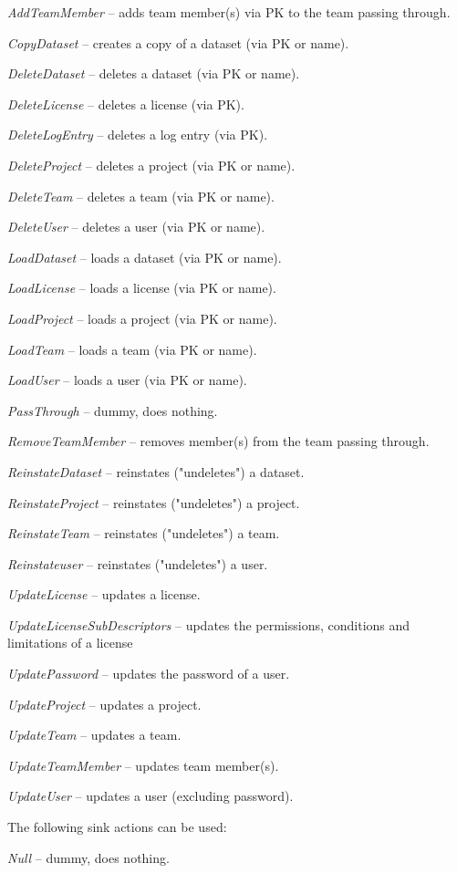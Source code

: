 \documentclass[a4paper]{book}
\begin{document}
\begin{tight_itemize}
  \item \textit{AddTeamMember} -- adds team member(s) via PK to the team passing through.
  \item \textit{CopyDataset} -- creates a copy of a dataset (via PK or name).
  \item \textit{DeleteDataset} -- deletes a dataset (via PK or name).
  \item \textit{DeleteLicense} -- deletes a license (via PK).
  \item \textit{DeleteLogEntry} -- deletes a log entry (via PK).
  \item \textit{DeleteProject} -- deletes a project (via PK or name).
  \item \textit{DeleteTeam} -- deletes a team (via PK or name).
  \item \textit{DeleteUser} -- deletes a user (via PK or name).
  \item \textit{LoadDataset} -- loads a dataset (via PK or name).
  \item \textit{LoadLicense} -- loads a license (via PK or name).
  \item \textit{LoadProject} -- loads a project (via PK or name).
  \item \textit{LoadTeam} -- loads a team (via PK or name).
  \item \textit{LoadUser} -- loads a user (via PK or name).
  \item \textit{PassThrough} -- dummy, does nothing.
  \item \textit{RemoveTeamMember} -- removes member(s) from the team passing through.
  \item \textit{ReinstateDataset} -- reinstates ("undeletes") a dataset.
  \item \textit{ReinstateProject} -- reinstates ("undeletes") a project.
  \item \textit{ReinstateTeam} -- reinstates ("undeletes") a team.
  \item \textit{Reinstateuser} -- reinstates ("undeletes") a user.
  \item \textit{UpdateLicense} -- updates a license.
  \item \textit{UpdateLicenseSubDescriptors} -- updates the permissions, conditions and limitations of a license
  \item \textit{UpdatePassword} -- updates the password of a user.
  \item \textit{UpdateProject} -- updates a project.
  \item \textit{UpdateTeam} -- updates a team.
  \item \textit{UpdateTeamMember} -- updates team member(s).
  \item \textit{UpdateUser} -- updates a user (excluding password).
\end{tight_itemize}
The following sink actions can be used:
\begin{tight_itemize}
  \item \textit{Null} -- dummy, does nothing.
\end{tight_itemize}
\end{document}
